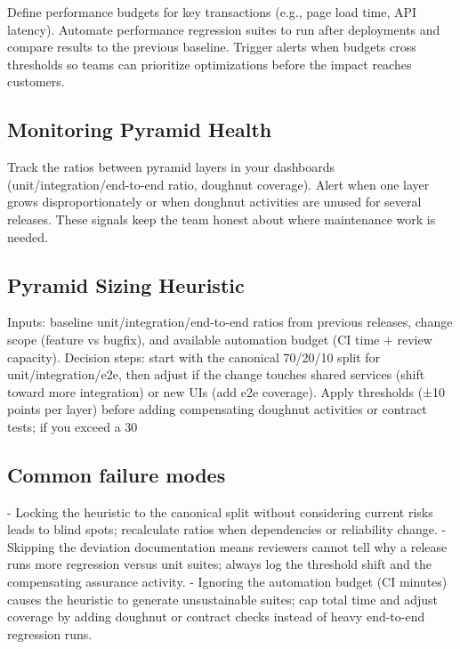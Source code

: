 Define performance budgets for key transactions (e.g., page load time, API latency). Automate performance regression suites to run after deployments and compare results to the previous baseline. Trigger alerts when budgets cross thresholds so teams can prioritize optimizations before the impact reaches customers.

\subsection{Monitoring Pyramid Health}

Track the ratios between pyramid layers in your dashboards (unit/integration/end-to-end ratio, doughnut coverage). Alert when one layer grows disproportionately or when doughnut activities are unused for several releases. These signals keep the team honest about where maintenance work is needed.

\subsection{Pyramid Sizing Heuristic}
Inputs: baseline unit/integration/end-to-end ratios from previous releases, change scope (feature vs bugfix), and available automation budget (CI time + review capacity). Decision steps: start with the canonical 70/20/10 split for unit/integration/e2e, then adjust if the change touches shared services (shift toward more integration) or new UIs (add e2e coverage). Apply thresholds (±10 points per layer) before adding compensating doughnut activities or contract tests; if you exceed a 30%

\subsection{Common failure modes}
- Locking the heuristic to the canonical split without considering current risks leads to blind spots; recalculate ratios when dependencies or reliability change.
- Skipping the deviation documentation means reviewers cannot tell why a release runs more regression versus unit suites; always log the threshold shift and the compensating assurance activity.
- Ignoring the automation budget (CI minutes) causes the heuristic to generate unsustainable suites; cap total time and adjust coverage by adding doughnut or contract checks instead of heavy end-to-end regression runs.

